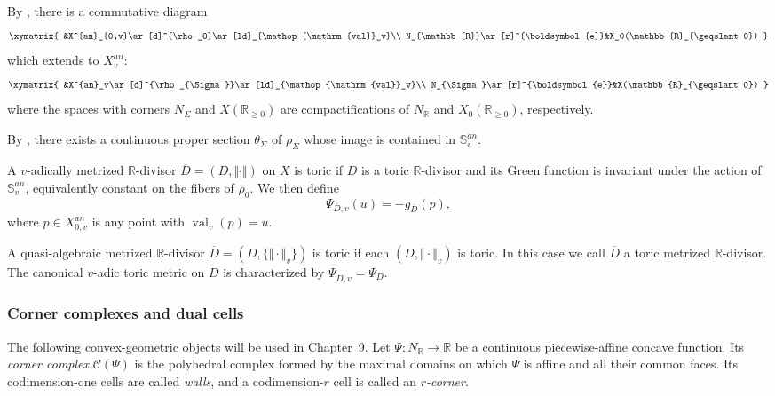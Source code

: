 \documentclass[10pt,a4paper]{amsart}
\theoremstyle{plain}
\DeclareMathOperator{\val}{val}
\theoremstyle{plain}
\numberwithin{equation}{section}
\begin{document}
\begin{prop}
	By \cite[Chapter 4.1]{BPS14}, there is a commutative diagram
	\begin{equation*}
		\xymatrix{
			&X^{an}_{0,v}\ar[d]^{\rho_0}\ar[ld]_{\val_v}\\
			N_{\mathbb{R}}\ar[r]^{\boldsymbol{e}}&X_0(\mathbb{R}_{\geqslant0})
		}
	\end{equation*}
	which extends to \(X^{an}_v\):
	\begin{equation*}
		\xymatrix{
			&X^{an}_v\ar[d]^{\rho_{\Sigma}}\ar[ld]_{\val_v}\\
			N_{\Sigma}\ar[r]^{\boldsymbol{e}}&X(\mathbb{R}_{\geqslant0})
		}
	\end{equation*}
	where the spaces with corners \(N_{\Sigma}\) and
	\(X(\mathbb{R}_{\geqslant0})\) are compactifications of \(N_{\mathbb R}\) and
	\(X_0(\mathbb R_{\geqslant0})\), respectively.
\end{prop}
\begin{prop}
	By \cite[Definition~4.2.12]{BPS14}, there exists a continuous proper section
	\(\theta_\Sigma\) of \(\rho_\Sigma\)
	whose image is contained in \(\mathbb S_v^{an}\).
\end{prop}
\begin{defn}
	A \(v\)-adically metrized \(\mathbb R\)-divisor
	\(\overline D=(D,\Vert\cdot\Vert)\) on \(X\) is toric if \(D\) is a toric
	\(\mathbb R\)-divisor and its Green function is invariant under the action of
	\(\mathbb S_v^{an}\), equivalently constant on the fibers of \(\rho_0\).  We
	then define
	\[
	\Psi_{\overline D,v}(u)=-g_{\overline D}(p),
	\]
	where \(p\in X^{an}_{0,v}\) is any point with \(\operatorname{val}_v(p)=u\).
	
	A quasi-algebraic metrized \(\mathbb R\)-divisor
	\(\overline D=(D,\{\Vert\cdot\Vert_v\})\) is toric if each
	\((D,\Vert\cdot\Vert_v)\) is toric.  In this case we call \(\overline D\) a
	toric metrized \(\mathbb R\)-divisor.  The canonical \(v\)-adic toric metric
	on \(D\) is characterized by \(\Psi_{\overline D,v}=\Psi_D\).
\end{defn}
\subsubsection*{Corner complexes and dual cells}
The following convex-geometric objects will be used in Chapter~9.  Let
\(\Psi:N_{\mathbb R}\to\mathbb R\) be a continuous piecewise-affine concave
function.  Its \emph{corner complex} \(\mathcal C(\Psi)\) is the polyhedral
complex formed by the maximal domains on which \(\Psi\) is affine and all
their common faces.  Its codimension-one cells are called \emph{walls}, and a
codimension-\(r\) cell is called an \emph{\(r\)-corner}.
\end{document}
